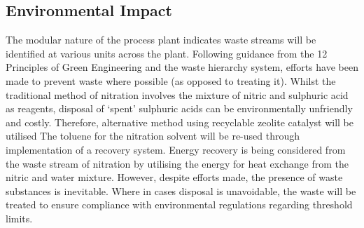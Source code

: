 

\subsection{Environmental Impact}

The modular nature of the process plant indicates waste streams will be identified at various units across the plant. Following guidance from the 12 Principles of Green Engineering and the waste hierarchy system, efforts have been made to prevent waste where possible (as opposed to treating it). Whilst the traditional method of nitration involves the mixture of nitric and sulphuric acid as reagents, disposal of ‘spent’ sulphuric acids can be environmentally unfriendly and costly. Therefore, alternative method using recyclable zeolite catalyst will be utilised %
The toluene for the nitration solvent will be re-used through implementation of a recovery system. Energy recovery is being considered from the waste stream of nitration by utilising the energy for heat exchange from the nitric and water mixture. However, despite efforts made, the presence of waste substances is inevitable. Where in cases disposal is unavoidable, the waste will be treated to ensure compliance with environmental regulations regarding threshold limits. 